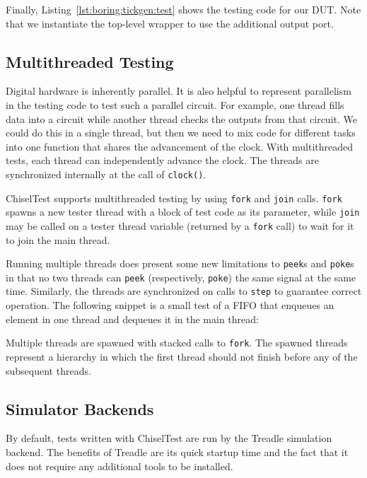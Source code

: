 \documentclass[%
    10pt,
    headinclude, footinclude=false,
    openright, %
    notitlepage,
    cleardoublepage=empty,
    headsepline,
    numbers=noenddot,
    bibliography=totoc, index=totoc,
    ]{scrbook}
\newcommand{\code}[1]{{\lstinline[basicstyle=\small\ttfamily]{#1}}}
\begin{document}

Finally, Listing~\ref{lst:boring:tickgen:test} shows the testing code for our DUT.
Note that we instantiate the top-level wrapper to use the additional output port.

\subsection{Multithreaded Testing}

Digital hardware is inherently parallel.
It is also helpful to represent parallelism in the testing code to test such a parallel circuit.
For example, one thread fills data into a circuit while another thread checks the outputs from that circuit.
We could do this in a single thread, but then we need to mix code for different tasks
into one function that shares the advancement of the clock.
With multithreaded tests, each thread can independently advance the clock.
The threads are synchronized internally at the call of \code{clock()}.

ChiselTest supports multithreaded testing by using \code{fork} and
\code{join} calls. \code{fork} spawns a new tester thread with a block of test code
as its parameter, while \code{join} may be called on a tester thread variable
(returned by a \code{fork} call) to wait for it to join the main thread.

Running multiple threads does present some new limitations to \code{peek}s and
\code{poke}s in that no two threads can \code{peek} (respectively, \code{poke}) the
same signal at the same time. Similarly, the threads
are synchronized on calls to \code{step} to guarantee correct operation.
The following snippet is a small test of a FIFO that enqueues an element in one thread
and dequeues it in the main thread:


Multiple threads are spawned with stacked calls to \code{fork}. The spawned threads
represent a hierarchy in which the first thread should not finish before any of the
subsequent threads.

\subsection{Simulator Backends}

By default, tests written with ChiselTest are run by the Treadle simulation backend.
The benefits of Treadle are its quick startup time and the fact that it does not require any additional tools to be installed.
\end{document}
